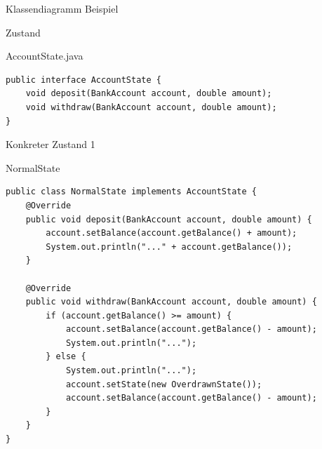 \begin{frame}{Klassendiagramm Beispiel}
\end{frame}

\begin{frame}[fragile]{Zustand}
	\begin{exampleblock}{AccountState.java}
     	  \begin{lstlisting}
public interface AccountState {
    void deposit(BankAccount account, double amount);
    void withdraw(BankAccount account, double amount);
}
     	  \end{lstlisting}
 	\end{exampleblock}
\end{frame}

\begin{frame}[fragile]{Konkreter Zustand 1}
	\begin{exampleblock}{NormalState}
 		\begin{lstlisting}
public class NormalState implements AccountState {
    @Override
    public void deposit(BankAccount account, double amount) {
        account.setBalance(account.getBalance() + amount);
        System.out.println("..." + account.getBalance());
    }

    @Override
    public void withdraw(BankAccount account, double amount) {
        if (account.getBalance() >= amount) {
            account.setBalance(account.getBalance() - amount);
            System.out.println("...");
        } else {
            System.out.println("...");
            account.setState(new OverdrawnState());
            account.setBalance(account.getBalance() - amount);  
        }
    }
} 
 		\end{lstlisting}
 	\end{exampleblock}
\end{frame}

